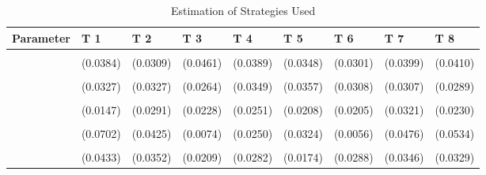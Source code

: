 \begin{table}[!h]
\centering
\caption{Estimation of Strategies Used}
\centering
\begin{tabular}[t]{lllllllll}
\toprule
Parameter & T 1 & T 2 & T 3 & T 4 & T 5 & T 6 & T 7 & T 8\\
\midrule
\cellcolor{gray!10}{gamma} & \cellcolor{gray!10}{0.8048***} & \cellcolor{gray!10}{0.6902***} & \cellcolor{gray!10}{0.7901***} & \cellcolor{gray!10}{0.8188***} & \cellcolor{gray!10}{0.7396***} & \cellcolor{gray!10}{0.8224***} & \cellcolor{gray!10}{0.7688***} & \cellcolor{gray!10}{0.8573***}\\
 & (0.0384) & (0.0309) & (0.0461) & (0.0389) & (0.0348) & (0.0301) & (0.0399) & (0.0410)\\
\cellcolor{gray!10}{AD} & \cellcolor{gray!10}{0.3861***} & \cellcolor{gray!10}{0.3025***} & \cellcolor{gray!10}{0.7983***} & \cellcolor{gray!10}{0.6336***} & \cellcolor{gray!10}{0.7132***} & \cellcolor{gray!10}{0.6838***} & \cellcolor{gray!10}{0.2914***} & \cellcolor{gray!10}{0.3109***}\\
 & (0.0327) & (0.0327) & (0.0264) & (0.0349) & (0.0357) & (0.0308) & (0.0307) & (0.0289)\\
\cellcolor{gray!10}{AC} & \cellcolor{gray!10}{0.0222} & \cellcolor{gray!10}{0.1607***} & \cellcolor{gray!10}{0.1067***} & \cellcolor{gray!10}{0.1238***} & \cellcolor{gray!10}{0.0942***} & \cellcolor{gray!10}{0.1025***} & \cellcolor{gray!10}{0.2127***} & \cellcolor{gray!10}{0.1291***}\\
\addlinespace
 & (0.0147) & (0.0291) & (0.0228) & (0.0251) & (0.0208) & (0.0205) & (0.0321) & (0.0230)\\
\cellcolor{gray!10}{G} & \cellcolor{gray!10}{0.1533*} & \cellcolor{gray!10}{0.2257***} & \cellcolor{gray!10}{0.0000} & \cellcolor{gray!10}{0.0391} & \cellcolor{gray!10}{0.0842**} & \cellcolor{gray!10}{0.0000} & \cellcolor{gray!10}{0.1648***} & \cellcolor{gray!10}{0.2306***}\\
 & (0.0702) & (0.0425) & (0.0074) & (0.0250) & (0.0324) & (0.0056) & (0.0476) & (0.0534)\\
\cellcolor{gray!10}{TFT} & \cellcolor{gray!10}{0.2761***} & \cellcolor{gray!10}{0.1304***} & \cellcolor{gray!10}{0.0463*} & \cellcolor{gray!10}{0.0994***} & \cellcolor{gray!10}{0.0531**} & \cellcolor{gray!10}{0.1185***} & \cellcolor{gray!10}{0.1389***} & \cellcolor{gray!10}{0.1519***}\\
 & (0.0433) & (0.0352) & (0.0209) & (0.0282) & (0.0174) & (0.0288) & (0.0346) & (0.0329)\\

\end{tabular}
\end{table}
